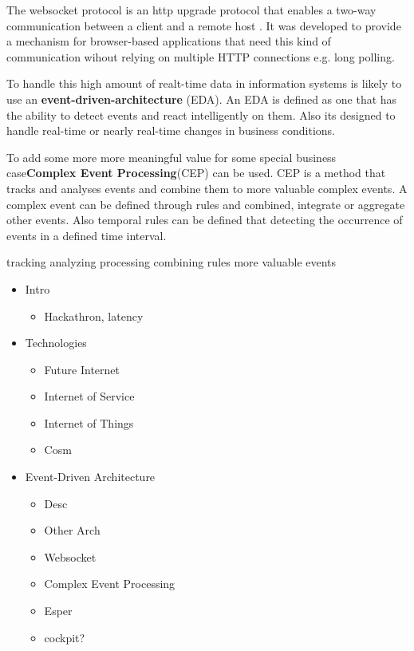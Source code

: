 \documentclass{acm_proc_article-sp}
\begin{document}
The websocket protocol is an http upgrade protocol that enables a two-way communication between a client and a remote host \cite{websocket}. It was developed to provide a mechanism for browser-based applications that need this kind of communication wihout relying on multiple HTTP connections e.g. long polling\cite{long_polling}. 

To handle this high amount of realt-time data in information systems is likely to use an \textbf{event-driven-architecture} (EDA). An EDA is defined as one that has the ability to detect events and react intelligently on them. Also its designed to handle real-time or nearly real-time changes in business conditions.\cite{EDA:Taylor}

To add some more more meaningful value for some special business case\textbf{Complex Event Processing}(CEP) can be used. CEP is a method that tracks and analyses events and combine them to more valuable complex events. A complex event can be defined through rules and combined, integrate or aggregate other events. Also temporal rules can be defined that detecting the occurrence of events in a defined time interval.

 
tracking
analyzing
processing
combining
rules
more valuable events


\newpage

\begin{itemize}
	\item Intro
	\begin{itemize}	
	\item Hackathron, latency
	\end{itemize}
	\item Technologies
	\begin{itemize}
	\item Future Internet
	\item Internet of Service
	\item Internet of Things
	\item Cosm
	\end{itemize}
	
	\item Event-Driven Architecture	
	\begin{itemize}
	\item Desc
	\item Other Arch
	\item Websocket	
	\item Complex Event Processing	
	\item Esper
	\item cockpit?
	\end{itemize}

\end{itemize}
\end{document}
